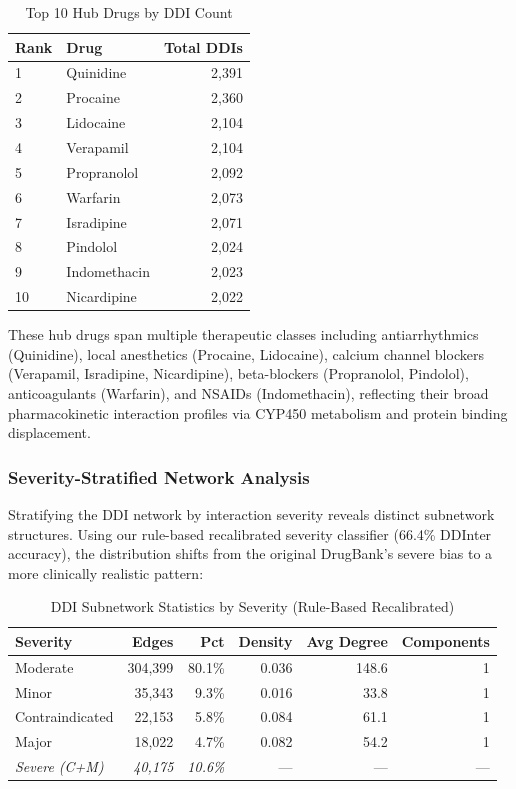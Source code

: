 \documentclass[11pt,a4paper]{article}
\begin{document}
\begin{table}[H]
\centering
\caption{Top 10 Hub Drugs by DDI Count}
\label{tab:hub_drugs}
\begin{tabular}{llr}
\toprule
\textbf{Rank} & \textbf{Drug} & \textbf{Total DDIs} \\
\midrule
1 & Quinidine & 2,391 \\
2 & Procaine & 2,360 \\
3 & Lidocaine & 2,104 \\
4 & Verapamil & 2,104 \\
5 & Propranolol & 2,092 \\
6 & Warfarin & 2,073 \\
7 & Isradipine & 2,071 \\
8 & Pindolol & 2,024 \\
9 & Indomethacin & 2,023 \\
10 & Nicardipine & 2,022 \\
\bottomrule
\end{tabular}
\end{table}

These hub drugs span multiple therapeutic classes including antiarrhythmics (Quinidine), local anesthetics (Procaine, Lidocaine), calcium channel blockers (Verapamil, Isradipine, Nicardipine), beta-blockers (Propranolol, Pindolol), anticoagulants (Warfarin), and NSAIDs (Indomethacin), reflecting their broad pharmacokinetic interaction profiles via CYP450 metabolism and protein binding displacement.

\subsubsection*{Severity-Stratified Network Analysis}

Stratifying the DDI network by interaction severity reveals distinct subnetwork structures. Using our rule-based recalibrated severity classifier (66.4\% DDInter accuracy), the distribution shifts from the original DrugBank's severe bias to a more clinically realistic pattern:

\begin{table}[H]
\centering
\caption{DDI Subnetwork Statistics by Severity (Rule-Based Recalibrated)}
\label{tab:severity_networks}
\begin{tabular}{lrrrrr}
\toprule
\textbf{Severity} & \textbf{Edges} & \textbf{Pct} & \textbf{Density} & \textbf{Avg Degree} & \textbf{Components} \\
\midrule
Moderate & 304,399 & 80.1\% & 0.036 & 148.6 & 1 \\
Minor & 35,343 & 9.3\% & 0.016 & 33.8 & 1 \\
Contraindicated & 22,153 & 5.8\% & 0.084 & 61.1 & 1 \\
Major & 18,022 & 4.7\% & 0.082 & 54.2 & 1 \\
\midrule
\textit{Severe (C+M)} & \textit{40,175} & \textit{10.6\%} & --- & --- & --- \\
\bottomrule
\end{tabular}
\end{table}
\end{document}
